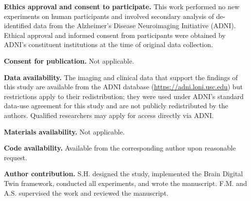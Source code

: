 \documentclass[pdflatex,sn-mathphys-num]{sn-jnl}%
\theoremstyle{thmstyleone}%
\theoremstyle{thmstyletwo}%
\theoremstyle{thmstylethree}%
\begin{document}
\noindent\textbf{Ethics approval and consent to participate.} This work performed no new experiments on human participants and involved secondary analysis of de-identified data from the Alzheimer's Disease Neuroimaging Initiative (ADNI). Ethical approval and informed consent from participants were obtained by ADNI's constituent institutions at the time of original data collection.

\noindent\textbf{Consent for publication.} Not applicable.

\noindent\textbf{Data availability.} The imaging and clinical data that support the findings of this study are available from the ADNI database (\url{https://adni.loni.usc.edu}) but restrictions apply to their redistribution; they were used under ADNI's standard data-use agreement for this study and are not publicly redistributed by the authors. Qualified researchers may apply for access directly via ADNI.

\noindent\textbf{Materials availability.} Not applicable.

\noindent\textbf{Code availability.} Available from the corresponding author upon reasonable request.

\noindent\textbf{Author contribution.} S.H. designed the study, implemented the Brain Digital Twin framework, conducted all experiments, and wrote the manuscript. F.M. and A.S. supervised the work and reviewed the manuscript.
\end{document}
